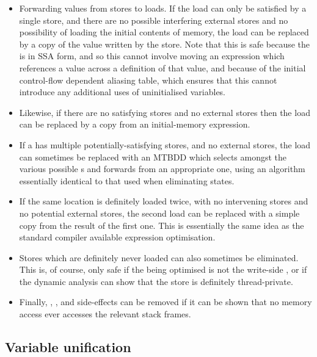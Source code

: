 \begin{itemize}
\item
  Forwarding values from stores to loads.  If the load can only be
  satisfied by a single store, and there are no possible interfering
  external stores and no possibility of loading the initial contents
  of memory, the load can be replaced by a copy of the value written
  by the store.  Note that this is safe because the {\StateMachine} is
  in SSA form, and so this cannot involve moving an expression which
  references a value across a definition of that value, and because of
  the initial control-flow dependent aliasing table, which ensures
  that this cannot introduce any additional uses of uninitialised
  variables.
\item
  Likewise, if there are no satisfying stores and no external stores
  then the load can be replaced by a copy from an initial-memory
  expression.
\item
  If a  has multiple potentially-satisfying stores, and no
  external stores, the load can sometimes be replaced with an MTBDD
  which selects amongst the various possible s and
  forwards from an appropriate one, using an algorithm essentially
  identical to that used when eliminating \state{$\Phi$} states.
\item
  If the same location is definitely loaded twice, with no intervening
  stores and no potential external stores, the second load can be
  replaced with a simple copy from the result of the first one.  This
  is essentially the same idea as the standard compiler available
  expression\needCite{} optimisation.
\item
  Stores which are definitely never loaded can also sometimes be
  eliminated.  This is, of course, only safe if the {\StateMachine}
  being optimised is not the write-side {\StateMachine}, or if the
  dynamic analysis can show that the store is definitely
  thread-private.
\item
  Finally, , , and
   side-effects can be removed if it can be shown
  that no memory access ever accesses the relevant stack
  frames.

\end{itemize}

\subsection{Variable unification}
\label{sect:unification}

